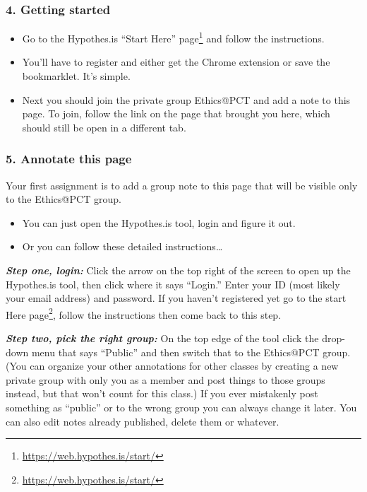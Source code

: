 \documentclass[12pt, openany]{book}
\renewcommand{\href}[2]{#2\footnote{\url{#1}}}
\begin{document}
\hypertarget{getting-started}{%
\subsubsection*{4. Getting started}\label{getting-started}}


\begin{itemize}
\item
  Go to the Hypothes.is \href{https://web.hypothes.is/start/}{``Start Here'' page} and follow the instructions.
\item
  You'll have to register and either get the Chrome extension or save the bookmarklet. It's simple.
\item
  Next you should join the private group Ethics@PCT and add a note to this page. To join, follow the link on the page that brought you here, which should still be open in a different tab.
\end{itemize}

\hypertarget{annotate-this-page}{%
\subsubsection*{5. Annotate this page}\label{annotate-this-page}}


Your first assignment is to add a group note to this page that will be visible only to the Ethics@PCT group.

\begin{itemize}
\item
  You can just open the Hypothes.is tool, login and figure it out.
\item
  Or you can follow these detailed instructions\ldots{}
\end{itemize}

\textbf{\emph{Step one, login:}} Click the arrow on the top right of the screen to open up the Hypothes.is tool, then click where it says ``Login.'' Enter your ID (most likely your email address) and password. If you haven't registered yet go to the \href{https://web.hypothes.is/start/}{start Here page}, follow the instructions then come back to this step.

\textbf{\emph{Step two, pick the right group:}} On the top edge of the tool click the drop-down menu that says ``Public'' and then switch that to the Ethics@PCT group. (You can organize your other annotations for other classes by creating a new private group with only you as a member and post things to those groups instead, but that won't count for this class.) If you ever mistakenly post something as ``public'' or to the wrong group you can always change it later. You can also edit notes already published, delete them or whatever.
\end{document}
